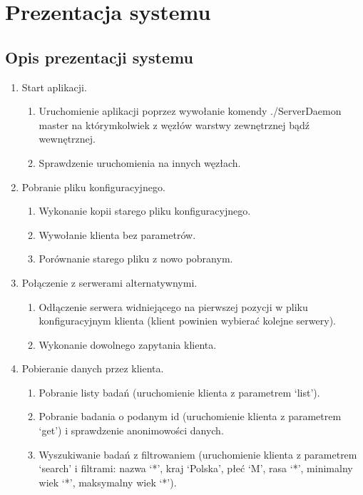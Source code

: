 \chapter{Prezentacja systemu}
\label{ap:2}

\section{Opis prezentacji systemu}

\begin{enumerate}
	\item Start aplikacji.
	\begin{enumerate}[label*=\arabic*.]
		\item Uruchomienie aplikacji poprzez wywołanie komendy ./ServerDaemon master na którymkolwiek z węzłów warstwy zewnętrznej bądź wewnętrznej.
		\item Sprawdzenie uruchomienia na innych węzłach. 
	\end{enumerate}
	\item Pobranie pliku konfiguracyjnego.
	\begin{enumerate}[label*=\arabic*.]
		\item Wykonanie kopii starego pliku konfiguracyjnego.
		\item Wywołanie klienta bez parametrów.
		\item Porównanie starego pliku z nowo pobranym.
	\end{enumerate}
	\item Połączenie z serwerami alternatywnymi.
	\begin{enumerate}[label*=\arabic*.]
		\item Odłączenie serwera widniejącego na pierwszej pozycji w pliku konfiguracyjnym klienta (klient powinien wybierać kolejne serwery).
		\item Wykonanie dowolnego zapytania klienta.
	\end{enumerate}
	\item Pobieranie danych przez klienta.
	\begin{enumerate}[label*=\arabic*.]
		\item Pobranie listy badań (uruchomienie klienta z parametrem ‘list’).
		\item Pobranie badania o podanym id (uruchomienie klienta z parametrem ‘get’) i sprawdzenie anonimowości danych.
		\item Wyszukiwanie badań z filtrowaniem (uruchomienie klienta z parametrem ‘search’ i filtrami: nazwa ‘*’, kraj ‘Polska’, płeć ‘M’, rasa ‘*’, minimalny wiek ‘*’, maksymalny wiek ‘*’).

\end{enumerate}
\end{enumerate}
